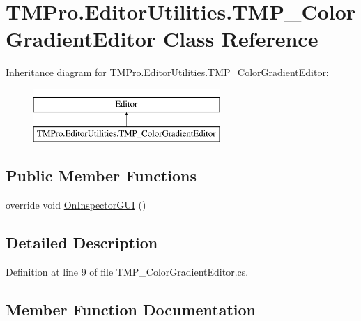 \hypertarget{class_t_m_pro_1_1_editor_utilities_1_1_t_m_p___color_gradient_editor}{}\section{T\+M\+Pro.\+Editor\+Utilities.\+T\+M\+P\+\_\+\+Color\+Gradient\+Editor Class Reference}
\label{class_t_m_pro_1_1_editor_utilities_1_1_t_m_p___color_gradient_editor}
Inheritance diagram for T\+M\+Pro.\+Editor\+Utilities.\+T\+M\+P\+\_\+\+Color\+Gradient\+Editor\+:\begin{figure}[H]
\begin{center}
\leavevmode
\includegraphics[height=2.000000cm]{class_t_m_pro_1_1_editor_utilities_1_1_t_m_p___color_gradient_editor}
\end{center}
\end{figure}
\subsection*{Public Member Functions}
\begin{DoxyCompactItemize}
\item 
override void \mbox{\hyperlink{class_t_m_pro_1_1_editor_utilities_1_1_t_m_p___color_gradient_editor_aa2077efd7632bf1411f2263b8c493462}{On\+Inspector\+G\+UI}} ()
\end{DoxyCompactItemize}


\subsection{Detailed Description}


Definition at line 9 of file T\+M\+P\+\_\+\+Color\+Gradient\+Editor.\+cs.



\subsection{Member Function Documentation}
\mbox{\label{class_t_m_pro_1_1_editor_utilities_1_1_t_m_p___color_gradient_editor_aa2077efd7632bf1411f2263b8c493462}} 
